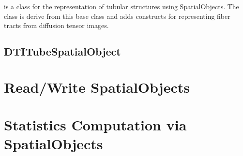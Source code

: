  is a class for the representation
of tubular structures using SpatialObjects.
 The class  is derive from this base class
and adds constructs for representing fiber tracts from diffusion tensor images.

\label{sec:TubeSpatialObject}



\subsection{DTITubeSpatialObject}
\label{sec:DTITubeSpatialObject}



\section{Read/Write SpatialObjects}
\label{sec:ReadWriteSpatialObjects}



\section{Statistics Computation via SpatialObjects}
\label{sec:SpatialObjectToImageStatisticsCalculator}

